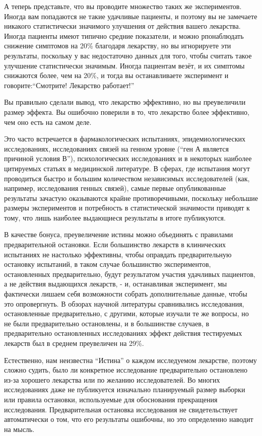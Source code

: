 А теперь представьте, что вы проводите множество таких же экспериментов. Иногда вам попадаются не такие удачливые пациенты, и поэтому вы не замечаете никакого статистически значимого улучшения от действия вашего лекарства. Иногда пациенты имеют типично средние показатели, и можно рпонаблюдать снижение симптомов на 20\% благодаря лекарству, но вы игнорируете эти результаты, поскольку у вас недостаточно данных для того, чтобы считать такое улучшение статистически значимым. Иногда пациентам везёт, и их симптомы снижаются более, чем на 20\%, и тогда вы останавливаете эксперимент и говорите:``Смотрите! Лекарство работает!'' 

Вы правильно сделали вывод, что лекарство эффективно, но вы преувеличили размер эффекта. Вы ошибочно поверили в то, что лекарство более эффективно, чем оно есть на самом деле. 

Это часто встречается в фармакологических испытаниях, эпидемиологических исследованиях, исследованиях связей на генном уровне (``ген А является причиной условия В''), психологических исследованиях и в некоторых наиболее цитируемых статьях в медицинской литературе. \cite{ioannidis_why_2008,ioannidis_contradicted_2005} В сферах, где испытания могут проводиться быстро и большим количеством независимых исследователей (как, например, исследования генных связей), самые первые опубликованные результаты зачастую оказываются крайне противоречивыми, поскольку небольшие размеры экспериментов и потребность в статистической значимости приводят к тому, что лишь наиболее выдающиеся результаты в итоге публикуются. \cite{ioannidis_early_2005} 

В качестве бонуса, преувеличение истины можно объединять с правилами предварительной остановки. Если большинство лекарств в клинических испытаниях не настолько эффективны, чтобы оправдать предварительную остановку испытаний, в таком случае большинство экспериментов, остановленных предварительно, будут результатом участия удачливых пациентов, а не действия выдающихся лекарств, - и, останавливая эксперимент, мы фактически лишаем себя возможности собрать дополнительные данные, чтобы это опровергнуть. В обзорах научной литературы сравнивались исследования, остановленные предварительно, с другими, которые изучали те же вопросы, но не были предварительно остановлены, и в большинстве случаев, в предварительно остановленных исследованиях эффект действия тестируемых лекарств был в среднем преувеличен на 29\%. \cite{bassler_stopping_2010} 

Естественно, нам неизвестна ``Истина'' о каждом исследуемом лекарстве, поэтому сложно судить, было ли конкретное исследование предварительно остановлено из-за хорошего лекарства или по желанию исследователей. Во многих исследованиях даже не публикуется изначально планируемый размер выборки или правила остановки, используемые для обоснования прекращения исследования. \cite{montori_randomized_2005} Предварительная остановка исследования не свидетельствует автоматически о том, что его результаты ошибочны, но это определенно наводит на мысль.  



